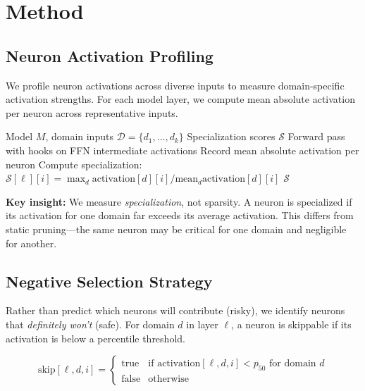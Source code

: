\documentclass{article}
\begin{document}
\section{Method}

\subsection{Neuron Activation Profiling}

We profile neuron activations across diverse inputs to measure domain-specific activation strengths. For each model layer, we compute mean absolute activation per neuron across representative inputs.

\begin{algorithm}[H]
\caption{Domain-Aware Neuron Profiling}
\begin{algorithmic}[1]
\REQUIRE Model $M$, domain inputs $\mathcal{D} = \{d_1, \ldots, d_k\}$
\ENSURE Specialization scores $\mathcal{S}$
        \STATE Forward pass with hooks on FFN intermediate activations
        \STATE Record mean absolute activation per neuron
    \ENDFOR
    \STATE Compute specialization: $\mathcal{S}[\ell][i] = \max_d \text{activation}[d][i] / \text{mean}_d \text{activation}[d][i]$
\ENDFOR
\RETURN $\mathcal{S}$
\end{algorithmic}
\end{algorithm}

\textbf{Key insight:} We measure \textit{specialization}, not sparsity. A neuron is specialized if its activation for one domain far exceeds its average activation. This differs from static pruning---the same neuron may be critical for one domain and negligible for another.

\subsection{Negative Selection Strategy}

Rather than predict which neurons will contribute (risky), we identify neurons that \textit{definitely won't} (safe). For domain $d$ in layer $\ell$, a neuron is skippable if its activation is below a percentile threshold.

\begin{equation}
\text{skip}[\ell, d, i] = \begin{cases}
\text{true} & \text{if } \text{activation}[\ell, d, i] < p_{50} \text{ for domain } d \\
\text{false} & \text{otherwise}
\end{cases}
\end{equation}
\end{document}
